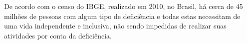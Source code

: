 













\par De acordo com o censo do IBGE, realizado em 2010, no Brasil, há cerca de 45 milhões de pessoas com algum tipo de deficiência e todas estas necessitam de uma vida independente e inclusiva, não sendo impedidas de realizar suas atividades por conta da deficiência.

